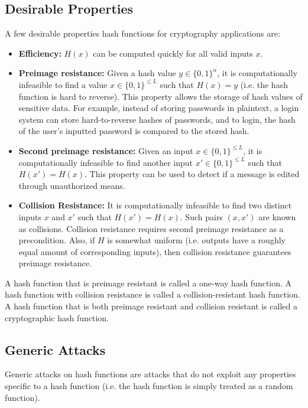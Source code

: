 \documentclass[12pt,titlepage]{article}
\begin{document}
    \subsection{Desirable Properties}
      A few desirable properties hash functions for cryptography applications are:
      \begin{itemize}
        \item \textbf{Efficiency:} $H(x)$ can be computed quickly for all valid inputs $x$.
        \item \textbf{Preimage resistance:} Given a hash value $y \in \{0, 1\}^n$, it is computationally infeasible to find a value $x \in \{0, 1\}^{\leq L}$ such that
          $H(x) = y$ (i.e. the hash function is hard to reverse). This property allows the storage of hash values of sensitive data. For example, instead of storing
          passwords in plaintext, a login system can store hard-to-reverse hashes of passwords, and to login, the hash of the user's inputted password is compared to
          the stored hash.
        \item \textbf{Second preimage resistance:} Given an input $x \in \{0, 1\}^{\leq L}$, it is computationally infeasible to find another input $x' \in \{0, 1\}^{\leq L}$
          such that $H(x') = H(x)$. This property can be used to detect if a message is edited through unauthorized means.
        \item \textbf{Collision Resistance:} It is computationally infeasible to find two distinct inputs $x$ and $x'$ such that $H(x') = H(x)$. Such pairs $(x, x')$ are known
          as collisions. Collision resistance requires second preimage resistance as a precondition. Also, if $H$ is somewhat uniform (i.e. outputs have a roughly equal amount
          of corresponding inputs), then collision resistance guarantees preimage resistance.
      \end{itemize}

      A hash function that is preimage resistant is called a one-way hash function. A hash function with collision resistance is called a collision-resistant hash function.
      A hash function that is both preimage resistant and collision resistant is called a cryptographic hash function.

    \subsection{Generic Attacks}
      Generic attacks on hash functions are attacks that do not exploit any properties specific to a hash function (i.e. the hash function is simply treated as a random function).
\end{document}
